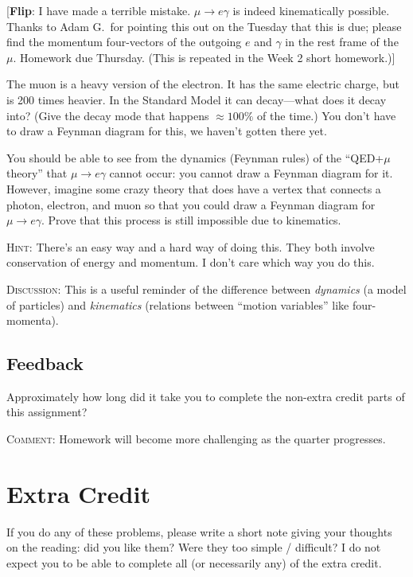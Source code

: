 \documentclass[12pt]{article}
\numberwithin{equation}{section}    %
\newcommand{\flip}[1]{{\color{red} [\textbf{Flip}: {#1}]}}
\begin{document}
\flip{I have made a terrible mistake. $\mu \to e\gamma$ is indeed kinematically possible. Thanks to Adam G.\ for pointing this out on the Tuesday that this is due; please find the momentum four-vectors of the outgoing $e$ and $\gamma$ in the rest frame of the $\mu$. Homework due Thursday. (This is repeated in the Week 2 short homework.)}

The muon is a heavy version of the electron. It has the same electric charge, but is 200 times heavier. In the Standard Model it can decay---what does it decay into? (Give the decay mode that happens $\approx 100\%$ of the time.) You don't have to draw a Feynman diagram for this, we haven't gotten there yet.

You should be able to see from the dynamics (Feynman rules) of the ``QED+$\mu$ theory'' that $\mu \to e \gamma$ cannot occur: you cannot draw a Feynman diagram for it. However, imagine some crazy theory that does have a vertex that connects a photon, electron, and muon so that you could draw a Feynman diagram for $\mu\to e \gamma$. Prove that this process is still impossible due to kinematics. 

\textsc{Hint}: There's an easy way and a hard way of doing this. They both involve conservation of energy and momentum. I don't care which way you do this.

\textsc{Discussion}: This is a useful reminder of the difference between \emph{dynamics} (a model of particles) and \emph{kinematics} (relations between ``motion variables'' like four-momenta).

\subsection{Feedback}

Approximately how long did it take you to complete the non-extra credit parts of this assignment?

\textsc{Comment}: Homework will become more challenging as the quarter progresses.



\section{Extra Credit}

If you do any of these problems, please write a short note giving your thoughts on the reading: did you like them? Were they too simple / difficult? I do not expect you to be able to complete all (or necessarily any) of the extra credit.
\end{document}
